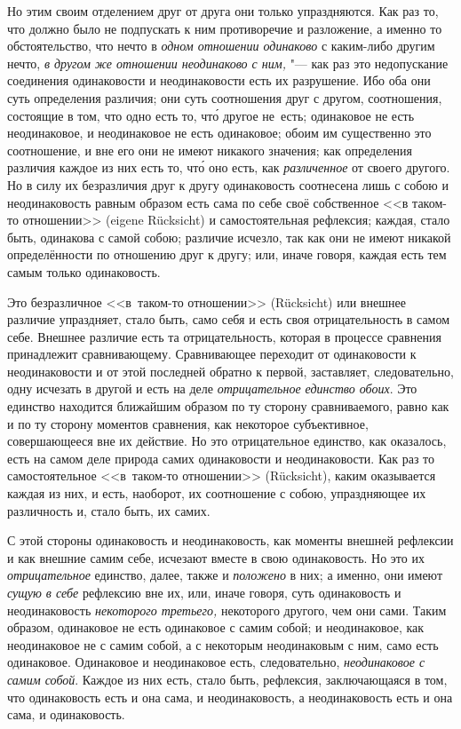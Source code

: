Но этим своим отделением друг от друга они только упраздняются. Как раз то,
что должно было не подпускать к ним противоречие и разложение, а именно то
обстоятельство, что нечто в {\em одном отношении одинаково}
с каким-либо другим нечто,
{\em в другом же отношении неодинаково с ним,} "--- как раз это
недопускание соединения одинаковости и неодинаковости есть их разрушение.
Ибо оба они суть определения различия; они суть соотношения друг с другом,
соотношения, состоящие в том, что одно есть то, чт\'{о} другое не~есть;
одинаковое не есть неодинаковое, и неодинаковое не есть одинаковое; обоим
им существенно это соотношение, и вне его они не имеют никакого значения;
как определения различия каждое из них есть то, чт\'{о} оно есть, как
{\em различенное} от своего другого. Но в силу их
безразличия друг к другу одинаковость соотнесена лишь с собою и
неодинаковость равным образом есть сама по себе своё собственное <<в
таком-то отношении>> (eigene Rücksicht) и самостоятельная рефлексия; каждая,
стало быть, одинакова с самой собою; различие исчезло, так как они не имеют
никакой определённости по отношению друг к другу; или, иначе говоря, каждая
есть тем самым только одинаковость.

Это безразличное <<в~таком-то отношении>> (Rücksicht) или внешнее различие
упраздняет, стало быть, само себя и есть своя отрицательность в самом себе.
Внешнее различие есть та отрицательность, которая в процессе сравнения
принадлежит сравнивающему. Сравнивающее переходит от одинаковости к
неодинаковости и от этой последней обратно к первой, заставляет,
следовательно, одну исчезать в другой и есть на деле
{\em отрицательное единство обоих}. Это единство
находится ближайшим образом по ту сторону сравниваемого, равно как и по ту
сторону моментов сравнения, как некоторое субъективное, совершающееся вне
их действие. Но это отрицательное единство, как оказалось, есть на самом
деле природа самих одинаковости и неодинаковости. Как раз то
самостоятельное <<в~таком-то отношении>> (Rücksicht), каким оказывается
каждая из них, и есть, наоборот, их соотношение с собою, упраздняющее их
различность и, стало быть, их самих.

С этой стороны одинаковость и неодинаковость, как моменты внешней рефлексии
и как внешние самим себе, исчезают вместе в свою одинаковость. Но это их
{\em отрицательное} единство, далее, также и
{\em положено} в них; а именно, они имеют
{\em сущую в себе} рефлексию вне их, или, иначе говоря,
суть одинаковость и неодинаковость {\em некоторого
третьего,} некоторого другого, чем они сами. Таким образом, одинаковое не
есть одинаковое с самим собой; и неодинаковое, как неодинаковое не с самим
собой, а с некоторым неодинаковым с ним, само есть одинаковое. Одинаковое и
неодинаковое есть, следовательно, {\em неодинаковое с
самим собой}. Каждое из них есть, стало быть, рефлексия, заключающаяся в
том, что одинаковость есть и она сама, и неодинаковость, а неодинаковость
есть и она сама, и одинаковость.

